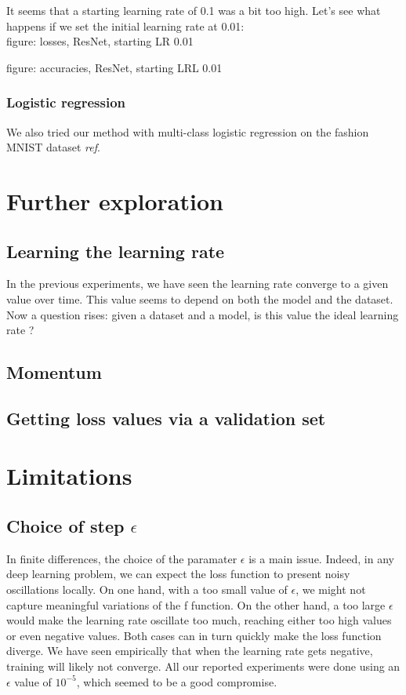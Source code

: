 \documentclass{article}
\begin{document}
  It seems that a starting learning rate of 0.1 was a bit too high. Let's see what happens if we set the initial learning rate at 0.01:\\
  
  figure: losses, ResNet, starting LR 0.01

  figure: accuracies, ResNet, starting LRL 0.01  
  
  
  \subsubsection{Logistic regression}
  
  We also tried our method with multi-class logistic regression on the fashion MNIST dataset \emph{ref}. 
  
  \section{Further exploration}
  
  \subsection{Learning the learning rate}
  
  In the previous experiments, we have seen the learning rate converge to a given value over time. This value seems to depend on both the model and the dataset. Now a question rises: given a dataset and a model, is this value the ideal learning rate ?
  
  \subsection{Momentum}
  
  \subsection{Getting loss values via a validation set}
  
  \section{Limitations}
  
  \subsection{Choice of step $\epsilon$}
  
  In finite differences, the choice of the paramater $\epsilon$ is a main issue. Indeed, in any deep learning problem, we can expect the loss function to present noisy oscillations locally. On one hand, with a too small value of $\epsilon$, we might not capture meaningful variations of the f function. On the other hand, a too large $\epsilon$ would make the learning rate oscillate too much, reaching either too high values or even negative values. Both cases can in turn quickly make the loss function diverge. We have seen empirically that when the learning rate gets negative, training will likely not converge. All our reported experiments were done using an $\epsilon$ value of $10^{-5}$, which seemed to be a good compromise.
  
\end{document}
